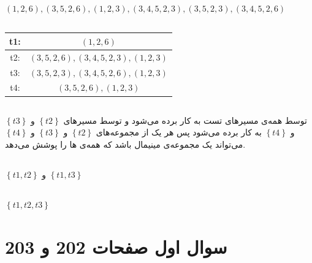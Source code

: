 \documentclass{article}
\begin{document}
\subsection{}
\begin{latin}
$
(1,2,6), (3,5,2,6), (1,2,3), (3,4,5,2,3), (3,5,2,3), (3,4,5,2,6)
$
\end{latin}

\subsection{}
\begin{latin}
\begin{table}[H]
\begin{tabular}{|c|c|}
\hline
t1: & $(1, 2, 6)$                                \\ \hline
t2: & $(3, 5, 2, 6), (3, 4, 5, 2, 3), (1, 2, 3)$ \\ \hline
t3: & $(3, 5, 2, 3), (3, 4, 5, 2, 6), (1, 2, 3)$ \\ \hline
t4: & $(3, 5, 2, 6), (1, 2, 3)$                  \\ \hline
\end{tabular}
\end{table}
\end{latin}

\subsection{}
 توسط همه‌ی مسیرهای تست به کار برده می‌شود و  توسط مسیرهای $\left\{ t2\right\}$ و $\left\{ t3\right\}$ و $\left\{ t4\right\}$ به کار برده می‌شود پس هر یک از مجموعه‌های $\left\{ t2\right\}$ و $\left\{ t3\right\}$ و $\left\{ t4\right\}$ می‌تواند یک مجموعه‌ی مینیمال باشد که همه‌ی ها را پوشش می‌دهد.

\subsection{}
$\left\{ t1, t2 \right\}$ و $\left\{ t1, t3 \right\}$ 

\subsection{}
$\left\{ t1, t2, t3 \right\}$ 


\section{سوال اول صفحات 202 و 203}
\end{document}
